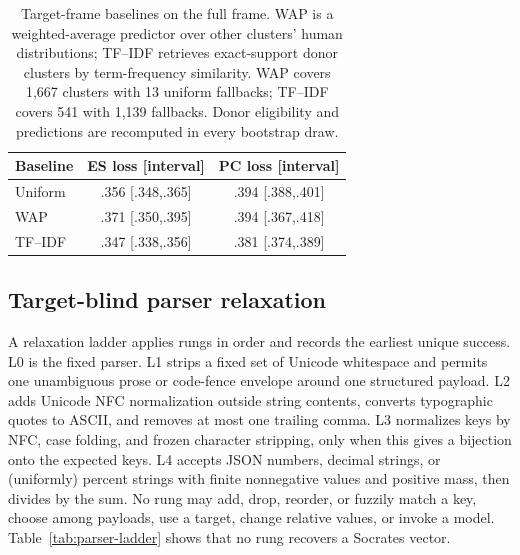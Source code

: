 \documentclass[11pt]{article}
\newcommand{\ES}{\textsc{ES}}
\newcommand{\PC}{\textsc{PC}}
\begin{document}
\begin{table}[!htb]
\centering
\footnotesize
\setlength{\tabcolsep}{3pt}
\begin{tabular}{@{}lcc@{}}
\toprule
Baseline & \ES{} loss [interval] & \PC{} loss [interval] \\
\midrule
Uniform & .356 [.348,.365] & .394 [.388,.401] \\
WAP & .371 [.350,.395] & .394 [.367,.418] \\
TF--IDF & .347 [.338,.356] & .381 [.374,.389] \\
\bottomrule
\end{tabular}
\caption{Target-frame baselines on the full frame. WAP is a weighted-average
predictor over other clusters' human distributions; TF--IDF retrieves
exact-support donor clusters by term-frequency similarity. WAP covers 1,667
clusters with 13 uniform fallbacks; TF--IDF covers 541 with 1,139 fallbacks.
Donor eligibility and predictions are recomputed in every bootstrap draw.}
\label{tab:controls}
\end{table}

\subsection{Target-blind parser relaxation}
\label{app:parser}

A relaxation ladder applies rungs in order and records the earliest unique
success. L0 is the fixed parser. L1 strips a fixed set of Unicode whitespace
and permits one unambiguous prose or code-fence envelope around one structured
payload. L2 adds Unicode NFC normalization outside string contents, converts
typographic quotes to ASCII, and removes at most one trailing comma. L3
normalizes keys by NFC, case folding, and frozen character stripping, only when
this gives a bijection onto the expected keys. L4 accepts JSON numbers, decimal
strings, or (uniformly) percent strings with finite nonnegative values and
positive mass, then divides by the sum. No rung may add, drop, reorder, or
fuzzily match a key, choose among payloads, use a target, change relative
values, or invoke a model. Table~\ref{tab:parser-ladder} shows that no rung
recovers a Socrates vector.
\end{document}

